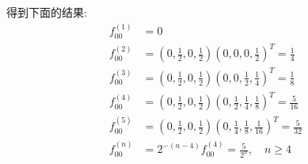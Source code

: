 \documentclass[boxes]{homework}
\begin{document}
\begin{solution}
    得到下面的结果:
    \begin{align}
        f_{00}^{(1)} & = 0                                                       \\
        f_{00}^{(2)} & = \left(0, \frac{1}{2}, 0, \frac{1}{2}\right)
        \left(0, 0, 0, \frac{1}{2}\right)^T = \frac{1}{4}                        \\
        f_{00}^{(3)} & = \left(0, \frac{1}{2}, 0, \frac{1}{2}\right)
        \left(0, 0, \frac{1}{2}, \frac{1}{4}\right)^T = \frac{1}{8}              \\
        f_{00}^{(4)} & = \left(0, \frac{1}{2}, 0, \frac{1}{2}\right)
        \left(0, \frac{1}{2}, \frac{1}{4}, \frac{1}{8}\right)^T = \frac{5}{16}   \\
        f_{00}^{(5)} & = \left(0, \frac{1}{2}, 0, \frac{1}{2}\right)
        \left(0, \frac{1}{4}, \frac{1}{8}, \frac{1}{16}\right)^T = \frac{5}{32}  \\
        f_{00}^{(n)} & = 2^{-(n - 4)}f_{00}^{(4)} = \frac{5}{2^n}, \quad n \ge 4
    \end{align}
\end{solution}
\end{document}
